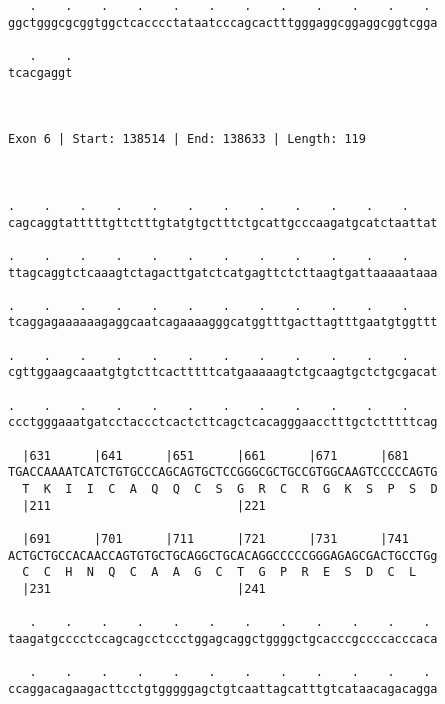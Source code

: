 \documentclass{article}
\begin{document}
\begin{Verbatim}
   .    .    .    .    .    .    .    .    .    .    .    . 
ggctgggcgcggtggctcacccctataatcccagcactttgggaggcggaggcggtcgga
                                                            
   .    .
tcacgaggt
         
         
 
Exon 6 | Start: 138514 | End: 138633 | Length: 119



.    .    .    .    .    .    .    .    .    .    .    .    
cagcaggtatttttgttctttgtatgtgctttctgcattgcccaagatgcatctaattat
                                                            
.    .    .    .    .    .    .    .    .    .    .    .    
ttagcaggtctcaaagtctagacttgatctcatgagttctcttaagtgattaaaaataaa
                                                            
.    .    .    .    .    .    .    .    .    .    .    .    
tcaggagaaaaaagaggcaatcagaaaagggcatggtttgacttagtttgaatgtggttt
                                                            
.    .    .    .    .    .    .    .    .    .    .    .    
cgttggaagcaaatgtgtcttcactttttcatgaaaaagtctgcaagtgctctgcgacat
                                                            
.    .    .    .    .    .    .    .    .    .    .    .    
ccctgggaaatgatcctaccctcactcttcagctcacagggaacctttgctctttttcag
                                                            
  |631      |641      |651      |661      |671      |681    
TGACCAAAATCATCTGTGCCCAGCAGTGCTCCGGGCGCTGCCGTGGCAAGTCCCCCAGTG
  T  K  I  I  C  A  Q  Q  C  S  G  R  C  R  G  K  S  P  S  D
  |211                          |221                        
  
  |691      |701      |711      |721      |731      |741    
ACTGCTGCCACAACCAGTGTGCTGCAGGCTGCACAGGCCCCCGGGAGAGCGACTGCCTGg
  C  C  H  N  Q  C  A  A  G  C  T  G  P  R  E  S  D  C  L   
  |231                          |241                        
  
   .    .    .    .    .    .    .    .    .    .    .    . 
taagatgcccctccagcagcctccctggagcaggctggggctgcacccgccccacccaca
                                                            
   .    .    .    .    .    .    .    .    .    .    .    . 
ccaggacagaagacttcctgtgggggagctgtcaattagcatttgtcataacagacagga
                                                            

\end{Verbatim}
\end{document}
